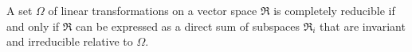 A set $\Omega$ of linear transformations on a vector space $\mathfrak{R}$ is completely reducible if and only if $\mathfrak{R}$ can be expressed as a direct sum of subspaces $\mathfrak{R}_i$ that are invariant and irreducible relative to $\Omega$.
